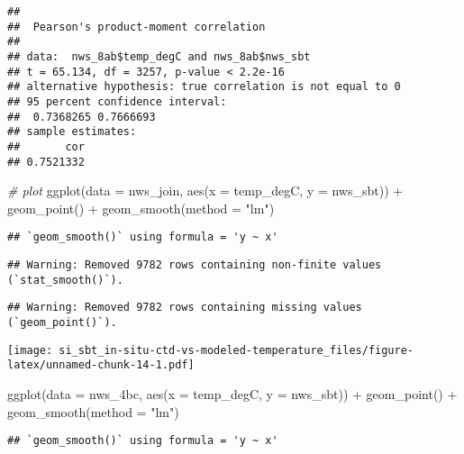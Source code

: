 \documentclass[
]{article}
\newenvironment{Shaded}{\begin{snugshade}}{\end{snugshade}}
\newcommand{\AttributeTok}[1]{\textcolor[rgb]{0.77,0.63,0.00}{#1}}
\newcommand{\CommentTok}[1]{\textcolor[rgb]{0.56,0.35,0.01}{\textit{#1}}}
\newcommand{\FunctionTok}[1]{\textcolor[rgb]{0.00,0.00,0.00}{#1}}
\newcommand{\NormalTok}[1]{#1}
\newcommand{\SpecialCharTok}[1]{\textcolor[rgb]{0.00,0.00,0.00}{#1}}
\newcommand{\StringTok}[1]{\textcolor[rgb]{0.31,0.60,0.02}{#1}}
\begin{document}
\begin{verbatim}
## 
##  Pearson's product-moment correlation
## 
## data:  nws_8ab$temp_degC and nws_8ab$nws_sbt
## t = 65.134, df = 3257, p-value < 2.2e-16
## alternative hypothesis: true correlation is not equal to 0
## 95 percent confidence interval:
##  0.7368265 0.7666693
## sample estimates:
##       cor 
## 0.7521332
\end{verbatim}

\begin{Shaded}
\begin{Highlighting}[]
\CommentTok{\# plot}
\FunctionTok{ggplot}\NormalTok{(}\AttributeTok{data =}\NormalTok{ nws\_join, }\FunctionTok{aes}\NormalTok{(}\AttributeTok{x =}\NormalTok{ temp\_degC, }\AttributeTok{y =}\NormalTok{ nws\_sbt)) }\SpecialCharTok{+} \FunctionTok{geom\_point}\NormalTok{() }\SpecialCharTok{+} \FunctionTok{geom\_smooth}\NormalTok{(}\AttributeTok{method =} \StringTok{"lm"}\NormalTok{)}
\end{Highlighting}
\end{Shaded}

\begin{verbatim}
## `geom_smooth()` using formula = 'y ~ x'
\end{verbatim}

\begin{verbatim}
## Warning: Removed 9782 rows containing non-finite values (`stat_smooth()`).
\end{verbatim}

\begin{verbatim}
## Warning: Removed 9782 rows containing missing values (`geom_point()`).
\end{verbatim}

\texttt{[image: si\_sbt\_in-situ-ctd-vs-modeled-temperature\_files/figure-latex/unnamed-chunk-14-1.pdf]}

\begin{Shaded}
\begin{Highlighting}[]
\FunctionTok{ggplot}\NormalTok{(}\AttributeTok{data =}\NormalTok{ nws\_4bc, }\FunctionTok{aes}\NormalTok{(}\AttributeTok{x =}\NormalTok{ temp\_degC, }\AttributeTok{y =}\NormalTok{ nws\_sbt)) }\SpecialCharTok{+} \FunctionTok{geom\_point}\NormalTok{() }\SpecialCharTok{+} \FunctionTok{geom\_smooth}\NormalTok{(}\AttributeTok{method =} \StringTok{"lm"}\NormalTok{) }
\end{Highlighting}
\end{Shaded}

\begin{verbatim}
## `geom_smooth()` using formula = 'y ~ x'
\end{verbatim}
\end{document}
